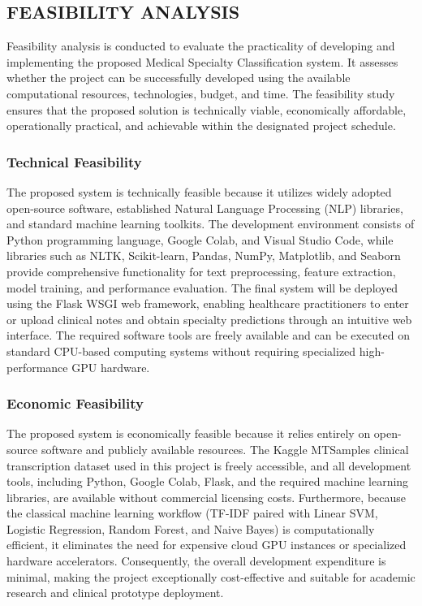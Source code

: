 \FloatBarrier

\subsection{FEASIBILITY ANALYSIS}

Feasibility analysis is conducted to evaluate the practicality of developing and implementing the proposed Medical Specialty Classification system. It assesses whether the project can be successfully developed using the available computational resources, technologies, budget, and time. The feasibility study ensures that the proposed solution is technically viable, economically affordable, operationally practical, and achievable within the designated project schedule.

\subsubsection{Technical Feasibility}
The proposed system is technically feasible because it utilizes widely adopted open-source software, established Natural Language Processing (NLP) libraries, and standard machine learning toolkits. The development environment consists of Python programming language, Google Colab, and Visual Studio Code, while libraries such as NLTK, Scikit-learn, Pandas, NumPy, Matplotlib, and Seaborn provide comprehensive functionality for text preprocessing, feature extraction, model training, and performance evaluation. The final system will be deployed using the Flask WSGI web framework, enabling healthcare practitioners to enter or upload clinical notes and obtain specialty predictions through an intuitive web interface. The required software tools are freely available and can be executed on standard CPU-based computing systems without requiring specialized high-performance GPU hardware.

\subsubsection{Economic Feasibility}
The proposed system is economically feasible because it relies entirely on open-source software and publicly available resources. The Kaggle MTSamples clinical transcription dataset used in this project is freely accessible, and all development tools, including Python, Google Colab, Flask, and the required machine learning libraries, are available without commercial licensing costs. Furthermore, because the classical machine learning workflow (TF-IDF paired with Linear SVM, Logistic Regression, Random Forest, and Naive Bayes) is computationally efficient, it eliminates the need for expensive cloud GPU instances or specialized hardware accelerators. Consequently, the overall development expenditure is minimal, making the project exceptionally cost-effective and suitable for academic research and clinical prototype deployment.

